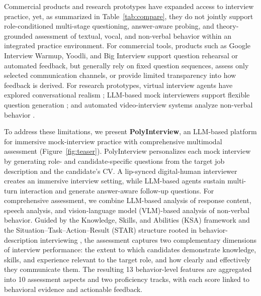 \documentclass[11pt]{article}
\begin{document}
Commercial products and research prototypes have expanded access to interview practice, yet, as summarized in Table~\ref{tab:compare}, they do not jointly support role-conditioned multi-stage questioning, answer-aware probing, and theory-grounded assessment of textual, vocal, and non-verbal behavior within an integrated practice environment. For commercial tools, products such as Google Interview Warmup, Yoodli, and Big Interview support question rehearsal or automated feedback, but generally rely on fixed question sequences, assess only selected communication channels, or provide limited transparency into how feedback is derived. For research prototypes, virtual interview agents have explored conversational realism \citep{hoque2013mach,anderson2013tardis,smith2014virtual}; LLM-based mock interviewers support flexible question generation \citep{li2023ezinterviewer,sun2025mockllm,daryanto2025conversate}; and automated video-interview systems analyze non-verbal behavior \citep{naim2018automated,hemamou2019hirenet}.

To address these limitations, we present \textbf{PolyInterview}, an LLM-based platform for immersive mock-interview practice with comprehensive multimodal assessment (Figure~\ref{fig:teaser}). PolyInterview personalizes each mock interview by generating role- and candidate-specific questions from the target job description and the candidate's CV. A lip-synced digital-human interviewer creates an immersive interview setting, while LLM-based agents sustain multi-turn interaction and generate answer-aware follow-up questions. For comprehensive assessment, we combine LLM-based analysis of response content, speech analysis, and vision-language model (VLM)-based analysis of non-verbal behavior. Guided by the Knowledge, Skills, and Abilities (KSA) framework \citep{peterson2001onet} and the Situation--Task--Action--Result (STAR) structure rooted in behavior-description interviewing \citep{janz1982behavior}, the assessment captures two complementary dimensions of interview performance: the extent to which candidates demonstrate knowledge, skills, and experience relevant to the target role, and how clearly and effectively they communicate them. The resulting 13 behavior-level features are aggregated into 10 assessment aspects and two proficiency tracks, with each score linked to behavioral evidence and actionable feedback.
\end{document}
